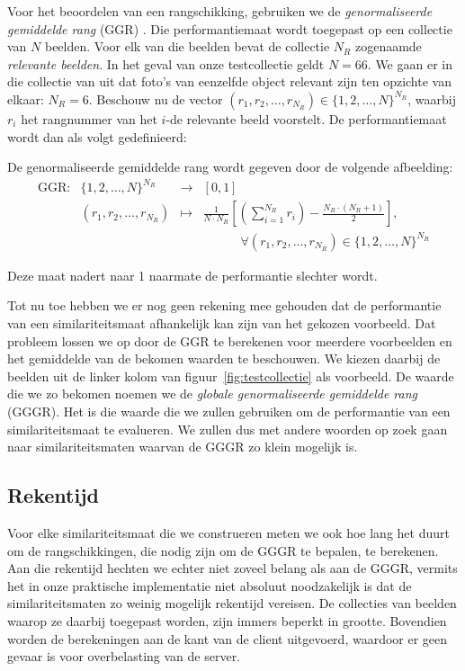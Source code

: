 Voor het beoordelen van een rangschikking, gebruiken we de \emph{genormaliseerde gemiddelde rang} 
(GGR) \cite{muller:perf_eval}. Die performantiemaat wordt toegepast op een collectie
van $N$ beelden. Voor elk van die beelden bevat de collectie
$N_R$ zogenaamde \emph{relevante beelden}. In het geval van onze testcollectie geldt $N = 66$.
We gaan er in die collectie van uit dat foto's van eenzelfde object relevant zijn ten opzichte
van elkaar: $N_R = 6$. Beschouw nu de vector 
$(r_1,r_2,\ldots,r_{N_R}) \in \{1,2,\ldots,N\}^{N_R}$, waarbij $r_i$ het
rangnummer van het $i$-de relevante beeld voorstelt. De performantiemaat
wordt dan als volgt gedefinieerd:
\begin{definitie}
De genormaliseerde gemiddelde rang wordt gegeven door de volgende afbeelding:
\begin{displaymath}
\begin{array}{lrcl}
\textrm{GGR}: 	& \{1,2,\ldots,N\}^{N_R} & \to 	& [0,1] \\
		& (r_1,r_2,\ldots,r_{N_R}) & \mapsto &
	{\displaystyle\frac{1}{N \cdot N_R}\left[ \left(\sum_{i=1}^{N_R}r_i\right) - \frac{N_R \cdot (N_R + 1)}{2} \right]},\\[15pt]
	& & & \qquad \quad \forall (r_1, r_2, ..., r_{N_R}) \in \{1,2,\ldots,N\}^{N_R}
\end{array}
\end{displaymath}
\end{definitie}
\noindent
Deze maat nadert naar 1 naarmate de performantie slechter wordt.

Tot nu toe hebben we er nog geen rekening mee gehouden dat de performantie van
een similariteitsmaat afhankelijk kan zijn van het gekozen voorbeeld. Dat probleem lossen we
op door de GGR te berekenen voor meerdere voorbeelden en het gemiddelde van de bekomen waarden
te beschouwen. We kiezen daarbij de beelden uit de linker kolom van 
figuur~\ref{fig:testcollectie} als voorbeeld. De waarde die we zo bekomen noemen we de
\emph{globale genormaliseerde gemiddelde rang} (GGGR). Het is die waarde die we zullen gebruiken
om de performantie van een similariteitsmaat te evalueren. We zullen dus met andere woorden op
zoek gaan naar similariteitsmaten waarvan de GGGR zo klein mogelijk is.

\subsection{Rekentijd}

Voor elke similariteitsmaat die we construeren meten we ook hoe lang het duurt om
de rangschikkingen, die nodig zijn om de GGGR te bepalen, te berekenen. Aan die 
rekentijd hechten we echter niet zoveel belang als aan de GGGR, vermits het in onze
praktische implementatie niet absoluut noodzakelijk is dat de similariteitsmaten zo weinig
mogelijk rekentijd vereisen. De collecties van beelden waarop ze daarbij toegepast worden,
zijn immers beperkt in grootte. Bovendien worden de berekeningen aan de kant van de client
uitgevoerd, waardoor er geen gevaar is voor overbelasting van de server.

